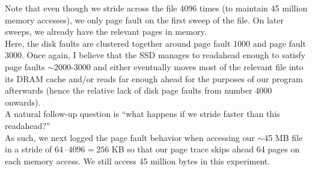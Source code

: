 \documentclass{article}
\begin{document}
	Note that even though we stride across the file 4096 times (to maintain 45 million memory accesses), we only page fault on the first sweep of the file. On later sweeps, we already have the relevant pages in memory.\\
	
	Here, the disk faults are clustered together around page fault 1000 and page fault 3000. Once again, I believe that the SSD manages to readahead enough to satisfy page faults $\sim$2000-3000 and either eventually moves most of the relevant file into its DRAM cache and/or reads far enough ahead for the purposes of our program afterwards (hence the relative lack of disk page faults from number 4000 onwards).\\
		
	A natural follow-up question is ``what happens if we stride faster than this readahead?''\\
	
	As such, we next logged the page fault behavior when accessing our $\sim$45 MB file in a stride of $64 \cdot 4096 = 256$ KB so that our page trace skips ahead 64 pages on each memory access. We still access 45 million bytes in this experiment.
	
\end{document}
